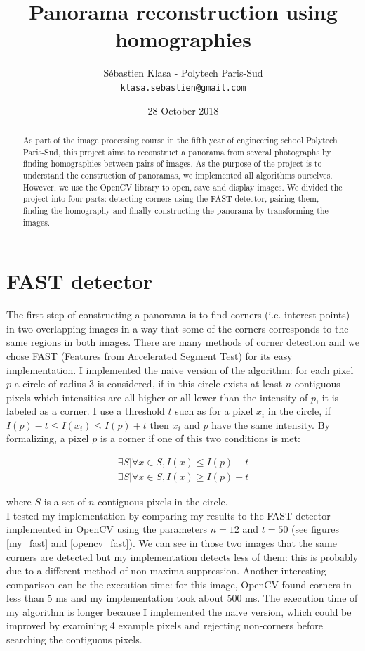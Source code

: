 \documentclass[a4paper,twocolumn]{article}
\title{Panorama reconstruction using homographies}
\author{
	Sébastien Klasa - Polytech Paris-Sud\\
	\texttt{klasa.sebastien@gmail.com}
}
\date{28 October 2018}
\begin{document}
	
\maketitle

\begin{abstract}
	As part of the image processing course in the fifth year of engineering school Polytech Paris-Sud, this project aims to reconstruct a panorama from several photographs by finding homographies between pairs of images. As the purpose of the project is to understand the construction of panoramas, we implemented all algorithms ourselves. However, we use the OpenCV library to open, save and display images. We divided the project into four parts: detecting corners using the FAST detector, pairing them, finding the homography and finally constructing the panorama by transforming the images.
\end{abstract}

\section{FAST detector}

The first step of constructing a panorama is to find corners (i.e. interest points) in two overlapping images in a way that some of the corners corresponds to the same regions in both images. There are many methods of corner detection and we chose FAST (Features from Accelerated Segment Test) for its easy implementation. I implemented the naive version of the algorithm: for each pixel $p$ a circle of radius 3 is considered, if in this circle exists at least $n$ contiguous pixels which intensities are all higher or all lower than the intensity of $p$, it is labeled as a corner. I use a threshold $t$ such as for a pixel $x_i$ in the circle, if $I(p) - t \le I(x_i) \le I(p) + t$ then $x_i$ and $p$ have the same intensity. By formalizing, a pixel $p$ is a corner if one of this two conditions is met:

\begin{align*}
\exists S | \forall x \in S, I(x) \le I(p) - t\\
\exists S | \forall x \in S, I(x) \ge I(p) + t
\end{align*}

where $S$ is a set of $n$ contiguous pixels in the circle.
\\

I tested my implementation by comparing my results to the FAST detector implemented in OpenCV using the parameters $n = 12$ and $t = 50$ (see figures \ref{my_fast} and \ref{opencv_fast}). We can see in those two images that the same corners are detected but my implementation detects less of them: this is probably due to a different method of non-maxima suppression. Another interesting comparison can be the execution time: for this image, OpenCV found corners in less than 5 ms and my implementation took about 500 ms. The execution time of my algorithm is longer because I implemented the naive version, which could be improved by examining 4 example pixels and rejecting non-corners before searching the contiguous pixels.
\end{document}
